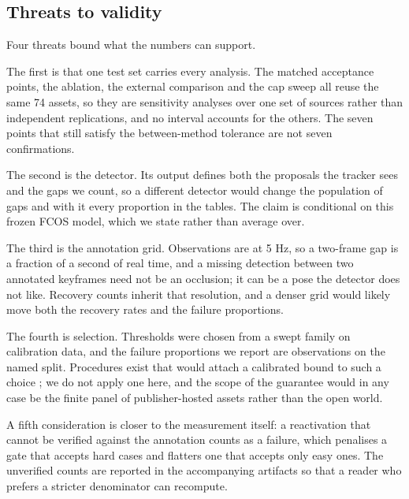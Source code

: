 \subsection{Threats to validity}

Four threats bound what the numbers can support.

The first is that one test set carries every analysis. The matched
acceptance points, the ablation, the external comparison and the cap sweep
all reuse the same 74 assets, so they are sensitivity analyses over one set
of sources rather than independent replications, and no interval accounts
for the others. The seven points that still satisfy the between-method
tolerance are not seven confirmations.

The second is the detector. Its output defines both the proposals the
tracker sees and the gaps we count, so a different detector would change
the population of gaps and with it every proportion in the tables. The
claim is conditional on this frozen FCOS model, which we state rather than
average over.

The third is the annotation grid. Observations are at 5 Hz, so a two-frame
gap is a fraction of a second of real time, and a missing detection between
two annotated keyframes need not be an occlusion; it can be a pose the
detector does not like. Recovery counts inherit that resolution, and a
denser grid would likely move both the recovery rates and the failure
proportions.

The fourth is selection. Thresholds were chosen from a swept family on
calibration data, and the failure proportions we report are observations on
the named split. Procedures exist that would attach a calibrated bound to
such a choice \cite{angelopoulos2021learn}; we do not apply one here, and
the scope of the guarantee would in any case be the finite panel of
publisher-hosted assets rather than the open world.

A fifth consideration is closer to the measurement itself: a reactivation
that cannot be verified against the annotation counts as a failure, which
penalises a gate that accepts hard cases and flatters one that accepts only
easy ones. The unverified counts are reported in the accompanying artifacts
so that a reader who prefers a stricter denominator can recompute.
